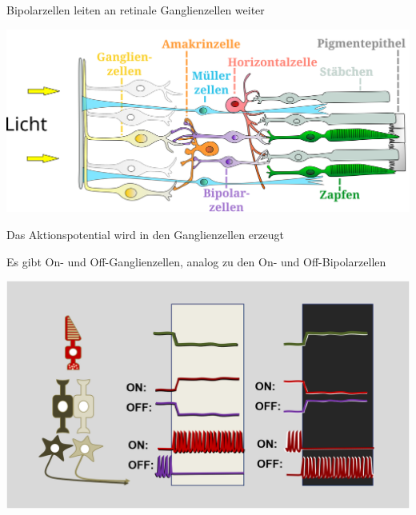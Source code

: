 \documentclass{beamer}
\begin{document}
\begin{frame}{Bipolarzellen leiten an retinale Ganglienzellen weiter}

\begin{center}
    \includegraphics[width=\textwidth]{Retina_de.png}
\end{center}

    
\end{frame}




\begin{frame}{Das Aktionspotential wird in den Ganglienzellen erzeugt}

Es gibt On- und Off-Ganglienzellen, analog zu den On- und Off-Bipolarzellen

\begin{center}
    \includegraphics[width=\textwidth]{on_off_bipolarzellen.png}
\end{center}


\end{frame}
\end{document}
